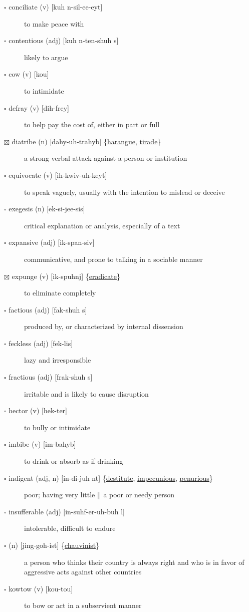 \documentclass[11pt]{article}
\begin{document}
\begin{description}
\item[{$\square$ conciliate (v) [kuh n-sil-ee-eyt]}] to make peace with
\item[{$\square$ contentious (adj) [kuh n-ten-shuh s]}] likely to argue
\item[{$\square$ cow (v) [kou]}] to intimidate
\item[{$\square$ defray (v) [dih-frey]}] to help pay the cost of, either in part or full
\item[{$\boxtimes$ \label{orgdfe7602}diatribe (n) [dahy-uh-trahyb] \{\hyperref[org045aced]{harangue}, \hyperref[org6667745]{tirade}\}}] a strong verbal attack against a person or institution
\item[{$\square$ equivocate (v) [ih-kwiv-uh-keyt]}] to speak vaguely, usually with the intention to mislead or deceive
\item[{$\square$ exegesis (n) [ek-si-jee-sis]}] critical explanation or analysis, especially of a text
\item[{$\square$ \label{org44395ef} expansive (adj) [ik-span-siv]}] communicative, and prone to talking in a sociable manner
\item[{$\boxtimes$ \label{org89a90ea}expunge (v) [ik-spuhnj] \{\hyperref[orga12b9b2]{eradicate}\}}] to eliminate completely
\item[{$\square$ factious (adj) [fak-shuh s]}] produced by, or characterized by internal dissension
\item[{$\square$ feckless (adj) [fek-lis]}] lazy and irresponsible
\item[{$\square$ fractious (adj) [frak-shuh s]}] irritable and is likely to cause disruption
\item[{$\square$ hector (v) [hek-ter]}] to bully or intimidate
\item[{$\square$ imbibe (v) [im-bahyb]}] to drink or absorb as if drinking
\item[{$\square$ \label{org975d945}indigent (adj, n) [in-di-juh nt] \{\hyperref[orgecdf9e1]{destitute}, \hyperref[org6910be9]{impecunious}, \hyperref[orgb268dd4]{penurious}\}}] poor; having very little || a poor or needy person
\item[{$\square$ insufferable (adj) [in-suhf-er-uh-buh l]}] intolerable, difficult to endure
\item[{$\square$ \label{orgcb9009a} (n) [jing-goh-ist] \{\hyperref[orga448555]{chauvinist}\}}] a person who thinks their country is always right and who is in favor of aggressive acts against other countries
\item[{$\square$ kowtow (v) [kou-tou]}] to bow or act in a subservient manner

\end{description}
\end{document}
